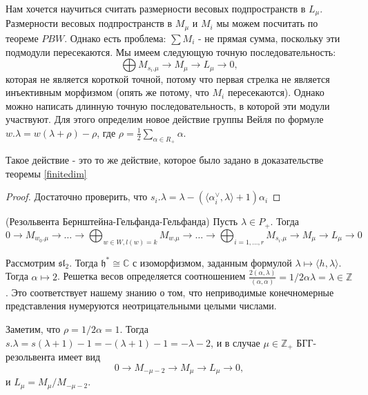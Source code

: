 \documentclass[a4article]{article}
\begin{document}
Нам хочется научиться считать размерности весовых подпространств в $L_{\mu}$. Размерности весовых подпространств в $M_{\mu}$ и $M_i$ мы можем посчитать по теореме $PBW$. Однако есть проблема: $\sum M_i$ - не прямая сумма, поскольку эти подмодули пересекаются. Мы имеем следующую точную последовательность:
\begin{equation}
    \bigoplus M_{s_i.\mu} \rightarrow M_{\mu}\rightarrow L_{\mu}\rightarrow 0,
\end{equation}
которая не является короткой точной, потому что первая стрелка не является инъективным морфизмом (опять же потому, что $M_i$ пересекаются). Однако можно написать длинную точную последовательность, в которой эти модули участвуют. Для этого определим новое действие группы Вейля по формуле $w.\lambda = w(\lambda+\rho)-\rho$, где $\rho = \frac{1}{2}\sum_{\alpha \in R_+}{\alpha}$.
\begin{lemma}
    Такое действие - это то же действие, которое было задано в доказательстве теоремы \ref{finitedim}
\end{lemma}
\begin{proof}
    Достаточно проверить, что $s_i.\lambda = \lambda - (\langle\alpha_i^{\vee}, \lambda \rangle+1)\alpha_i$
\end{proof}
\begin{theorem}(Резольвента Бернштейна-Гельфанда-Гельфанда)
    Пусть $\lambda \in P_+$. Тогда
    \begin{equation}
        0 \rightarrow M_{w_0.\mu} \rightarrow \ldots \rightarrow \bigoplus_{w \in W, l(w)=k} M_{w.\mu} \rightarrow \ldots \rightarrow \bigoplus_{i=1,\ldots, r} M_{s_i.\mu} \rightarrow M_{\mu} \rightarrow L_{\mu} \rightarrow 0
    \end{equation}
\end{theorem}
\begin{example}
    Рассмотрим $\mathfrak{sl}_2$. Тогда $\mathfrak{h}^* \cong \mathbb{C}$ с изоморфизмом, заданным формулой $\lambda \mapsto \langle h, \lambda \rangle$. Тогда $\alpha \mapsto 2$. Решетка весов определяется соотношением $\frac{2(\alpha, \lambda)}{(\alpha, \alpha)}=1/2\alpha\lambda=\lambda \in \mathbb{Z}$. Это соответствует нашему знанию о том, что неприводимые конечномерные представления нумеруются неотрицательными целыми числами. 

    Заметим, что $\rho=1/2\alpha=1$. Тогда 
    $s.\lambda = s(\lambda + 1)-1=-(\lambda+1)-1=-\lambda-2$, и в случае $\mu \in \mathbb{Z}_+$
    БГГ-резольвента имеет вид
    \begin{equation}
        0 \rightarrow M_{-\mu-2} \rightarrow M_{\mu} \rightarrow L_{\mu} \rightarrow 0,
    \end{equation}
    и $L_{\mu} = M_{\mu}/M_{-\mu-2}$.
\end{example}
\end{document}
